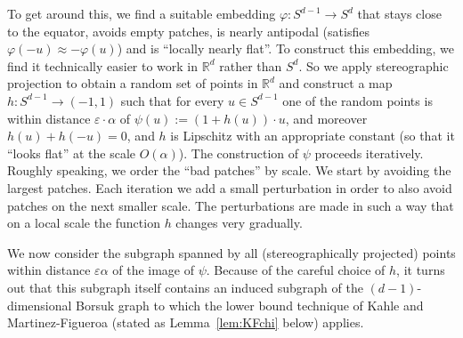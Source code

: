 \documentclass[11pt]{article}%
\newcommand{\eR}[0]{\ensuremath{ \mathbb R}}
\newcommand{\eps}{\varepsilon}
\begin{document}
To get around this, we find a suitable embedding $\varphi : S^{d-1} \to S^d$ that stays close to the equator, avoids 
empty patches, is nearly antipodal (satisfies $\varphi(-u) \approx -\varphi(u)$) and is ``locally nearly flat''. 
To construct this embedding, we find it technically easier to work in $\eR^d$ rather than $S^d$. So we 
apply stereographic projection to obtain a random set of points in $\eR^d$ and 
construct a map $h : S^{d-1} \to (-1,1)$ such that 
for every $u \in S^{d-1}$ one of the random points is within distance $\eps\cdot\alpha$ of $\psi(u) := (1+h(u))\cdot u$, and 
moreover $h(u)+h(-u)=0$, and $h$ is Lipschitz with an appropriate constant (so that it ``looks flat'' at the scale $O(\alpha)$).
The construction of $\psi$ proceeds iteratively. 
Roughly speaking, we order the ``bad patches'' by scale. We start by avoiding the largest patches. 
Each iteration we add a small perturbation in order to also avoid patches on the next smaller scale.
The perturbations are made in such a way that on a local scale the function $h$ changes very gradually.

We now consider the subgraph spanned by all (stereographically projected) points within distance $\eps\alpha$ 
of the image of $\psi$.
Because of the careful choice of $h$, it turns out that this subgraph itself contains an induced
subgraph of the $(d-1)$-dimensional Borsuk graph to which the lower bound technique of Kahle and Martinez-Figueroa 
(stated as Lemma~\ref{lem:KFchi} below) applies.

\vspace{1ex}
\end{document}

